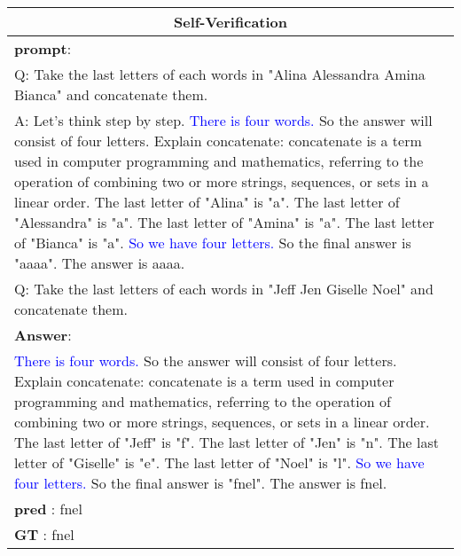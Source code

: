 \begin{table*}[htbp]
\begin{tabularx}{\textwidth}{X}
    \toprule
    \multicolumn{1}{c}{\textbf{Self-Verification}} \\
    \midrule
\textbf{prompt}: \\
Q: Take the last letters of each words in "Alina Alessandra Amina Bianca" and concatenate them.\\
A: Let's think step by step. \textcolor{blue} {There is four words.} So the answer will consist of four letters. Explain concatenate: concatenate is a term used in computer programming and mathematics, referring to the operation of combining two or more strings, sequences, or sets in a linear order. The last letter of "Alina" is "a". The last letter of "Alessandra" is "a". The last letter of "Amina" is "a". The last letter of "Bianca" is "a". \textcolor{blue} {So we have four letters.} So the final answer is "aaaa". The answer is aaaa.\\
Q: Take the last letters of each words in "Jeff Jen Giselle Noel" and concatenate them.\\
        \midrule
\textbf{Answer}:\\
 \textcolor{blue}{There is four words.} So the answer will consist of four letters. Explain concatenate: concatenate is a term used in computer programming and mathematics, referring to the operation of combining two or more strings, sequences, or sets in a linear order. The last letter of "Jeff" is "f". The last letter of "Jen" is "n". The last letter of "Giselle" is "e". The last letter of "Noel" is "l".  \textcolor{blue}{So we have four letters.} So the final answer is "fnel". The answer is fnel.\\
\textbf{pred} : fnel\\
\textbf{GT} : fnel\\


\end{tabularx}
\end{table*}
